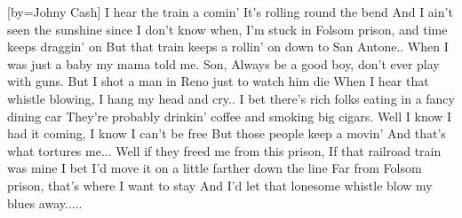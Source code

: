 [by={Johny Cash}]
\beginverse
I hear the train a comin'
It's rolling round the bend
And I ain't seen the sunshine since I don't know when,
I'm stuck in Folsom prison, and time keeps draggin' on
But that train keeps a rollin' on down to San Antone..
When I was just a baby my mama told me. Son,
Always be a good boy, don't ever play with guns.
But I shot a man in Reno just to watch him die
When I hear that whistle blowing, I hang my head and cry..
\endverse
\beginverse
I bet there's rich folks eating in a fancy dining car
They're probably drinkin' coffee and smoking big cigars.
Well I know I had it coming, I know I can't be free
But those people keep a movin'
And that's what tortures me...
\endverse
\beginverse
Well if they freed me from this prison,
If that railroad train was mine
I bet I'd move it on a little farther down the line
Far from Folsom prison, that's where I want to stay
And I'd let that lonesome whistle blow my blues away..... 
\endverse
\endsong